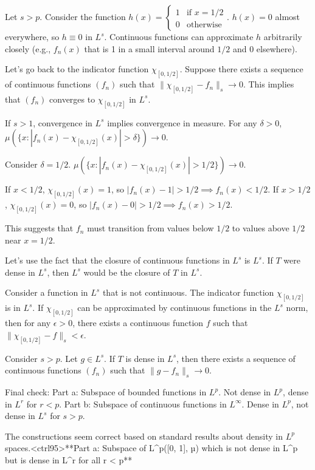 Let $s > p$. Consider the function $h(x) = \begin{cases} 1 & \text{if } x = 1/2 \\ 0 & \text{otherwise} \end{cases}$.
$h(x) = 0$ almost everywhere, so $h \equiv 0$ in $L^s$. Continuous functions can approximate $h$ arbitrarily closely (e.g., $f_n(x)$ that is 1 in a small interval around $1/2$ and 0 elsewhere).

Let's go back to the indicator function $\chi_{[0, 1/2]}$.
Suppose there exists a sequence of continuous functions $(f_n)$ such that $\|\chi_{[0, 1/2]} - f_n\|_s \to 0$.
This implies that $(f_n)$ converges to $\chi_{[0, 1/2]}$ in $L^s$.

If $s > 1$, convergence in $L^s$ implies convergence in measure.
For any $\delta > 0$, $\mu(\{x : |f_n(x) - \chi_{[0, 1/2]}(x)| > \delta\}) \to 0$.

Consider $\delta = 1/2$.
$\mu(\{x : |f_n(x) - \chi_{[0, 1/2]}(x)| > 1/2\}) \to 0$.

If $x < 1/2$, $\chi_{[0, 1/2]}(x) = 1$, so $|f_n(x) - 1| > 1/2 \implies f_n(x) < 1/2$.
If $x > 1/2$, $\chi_{[0, 1/2]}(x) = 0$, so $|f_n(x) - 0| > 1/2 \implies f_n(x) > 1/2$.

This suggests that $f_n$ must transition from values below $1/2$ to values above $1/2$ near $x = 1/2$.

Let's use the fact that the closure of continuous functions in $L^s$ is $L^s$.
If $T$ were dense in $L^s$, then $L^s$ would be the closure of $T$ in $L^s$.

Consider a function in $L^s$ that is not continuous. The indicator function $\chi_{[0, 1/2]}$ is in $L^s$.
If $\chi_{[0, 1/2]}$ can be approximated by continuous functions in the $L^s$ norm, then for any $\epsilon > 0$, there exists a continuous function $f$ such that $\|\chi_{[0, 1/2]} - f\|_s < \epsilon$.

Consider $s > p$.
Let $g \in L^s$. If $T$ is dense in $L^s$, then there exists a sequence of continuous functions $(f_n)$ such that $\|g - f_n\|_s \to 0$.

Final check:
Part a: Subspace of bounded functions in $L^p$. Not dense in $L^p$, dense in $L^r$ for $r < p$.
Part b: Subspace of continuous functions in $L^\infty$. Dense in $L^p$, not dense in $L^s$ for $s > p$.

The constructions seem correct based on standard results about density in $L^p$ spaces.<ctrl95>**Part a: Subspace of L^p([0, 1], µ) which is not dense in L^p but is dense in L^r for all r < p**

